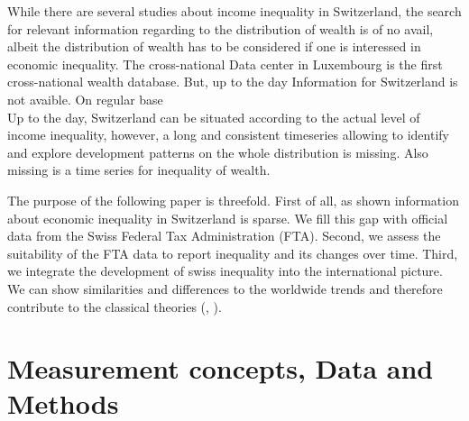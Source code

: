 \documentclass[twoside]{article}\usepackage[]{graphicx}\usepackage[]{color}
\begin{document}
\begin{multicols}{2}
While there are several studies about income inequality in Switzerland, the search for relevant information regarding to the distribution of wealth is of no avail, albeit the distribution of wealth has to be considered if one is interessed in economic inequality. The cross-national Data center in Luxembourg is the first cross-national wealth database. But, up to the day Information for Switzerland is not avaible. On regular base \\



Up to the day, Switzerland can be situated according to the actual level of income inequality, however, a long and consistent timeseries allowing to identify and explore development patterns on the whole distribution is missing. Also missing is a time series for inequality of wealth.


The purpose of the following paper is threefold. First of all, as shown information about economic inequality in Switzerland is sparse. We  fill this gap with official data from the Swiss Federal Tax Administration (FTA). Second, we assess the suitability of the FTA data to report inequality and its changes over time. Third, we integrate the development of swiss inequality into the international picture. We can show similarities and differences to the worldwide trends and therefore contribute to the classical theories (\cite{kuznets1955economic}, \cite{nielsen_kuznets_1997}).









\section{Measurement concepts, Data and Methods}


\end{multicols}
\end{document}
